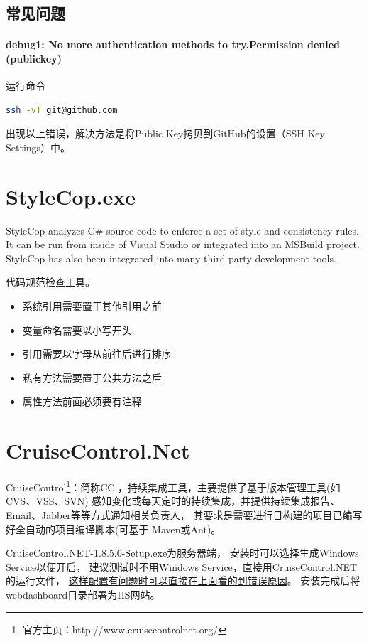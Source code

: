\documentclass{book}
\begin{document}
\subsection{常见问题}

\paragraph{debug1: No more authentication methods to try.Permission denied (publickey)}运行命令

\begin{lstlisting}[language=Bash]
ssh -vT git@github.com
\end{lstlisting}

出现以上错误，解决方法是将Public Key拷贝到GitHub的设置（SSH Key Settings）中。

\section{StyleCop.exe}

StyleCop analyzes C\# source code to enforce a set of style and consistency rules. It can be run from inside of Visual Studio or integrated into an MSBuild project. StyleCop has also been integrated into many third-party development tools.

代码规范检查工具。

\begin{itemize}
\item{系统引用需要置于其他引用之前}
\item{变量命名需要以小写开头}
\item{引用需要以字母从前往后进行排序}
\item{私有方法需要置于公共方法之后}
\item{属性方法前面必须要有注释}
\end{itemize}

\section{CruiseControl.Net}

CruiseControl\footnote{官方主页：http://www.cruisecontrolnet.org/}：简称CC ，持续集成工具，主要提供了基于版本管理工具(如CVS、VSS、SVN) 感知变化或每天定时的持续集成，并提供持续集成报告、Email、Jabber等等方式通知相关负责人，
其要求是需要进行日构建的项目已编写好全自动的项目编译脚本(可基于 Maven或Ant)。

CruiseControl.NET-1.8.5.0-Setup.exe为服务器端，
安装时可以选择生成Windows Service以便开启，
建议测试时不用Windows Service，直接用CruiseControl.NET 的运行文件，
\underline{这样配置有问题时可以直接在上面看的到错误原因}。
安装完成后将webdashboard目录部署为IIS网站。
\end{document}

